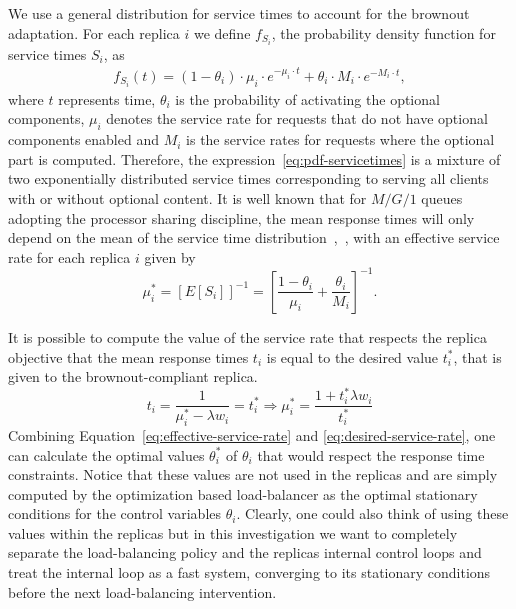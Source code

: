 We use a general distribution for service times to account for the
brownout adaptation. For each replica $i$ we define $f_{S_i}$, the
probability density function for service times $S_i$, as
\begin{align}
  f_{S_i} (t) = (1 - \theta_i) \cdot \mu_i \cdot e^{-\mu_i \cdot t} +
  \theta_i \cdot M_i \cdot e^{-M_i \cdot t} ,
\label{eq:pdf-servicetimes}
\end{align}
where $t$ represents time, $\theta_i$ is the probability of activating
the optional components, $\mu_i$ denotes the service rate for requests
that do not have optional components enabled and $M_i$ is the service
rates for requests where the optional part is computed. Therefore, the
expression~\eqref{eq:pdf-servicetimes} is a mixture of two
exponentially distributed service times corresponding to serving all
clients with or without optional content. It is well known that for $M/G/1$ queues adopting the processor sharing discipline, the mean response times will only depend on the mean of the service time distribution~\cite{kleinrock67},~\cite{sakata71}, with an effective service rate for each replica $i$ given by
\begin{equation}
  \mu_i^* = \left[ E[S_i] \right]^{-1} = \left[ \frac{1-\theta_i}{\mu_i}
    + \frac{\theta_i}{M_i} \right]^{-1} .
  \label{eq:effective-service-rate}
\end{equation}

It is possible to compute the value of the service rate that respects
the replica objective that the mean response times $t_i$ is equal to
the desired value $t_i^*$, that is given to the brownout-compliant
replica.
\begin{equation}
  t_i = \frac{1}{\mu_i^*-\lambda w_i} = t_i^*
  \Longrightarrow \mu_i^* = \frac{1+t_i^*\lambda w_i}{t_i^*} 
  \label{eq:desired-service-rate}
\end{equation}
Combining Equation~\eqref{eq:effective-service-rate} and
\eqref{eq:desired-service-rate}, one can calculate the optimal values
$\theta_i^*$ of $\theta_i$ that would respect the response time
constraints.  Notice that these values are not used in the replicas
and are simply computed by the optimization based load-balancer as the
optimal stationary conditions for the control variables
$\theta_i$. Clearly, one could also think of using these values within
the replicas but in this investigation we want to completely separate
the load-balancing policy and the replicas internal control loops and
treat the internal loop as a fast system, converging to its stationary
conditions before the next load-balancing intervention.

